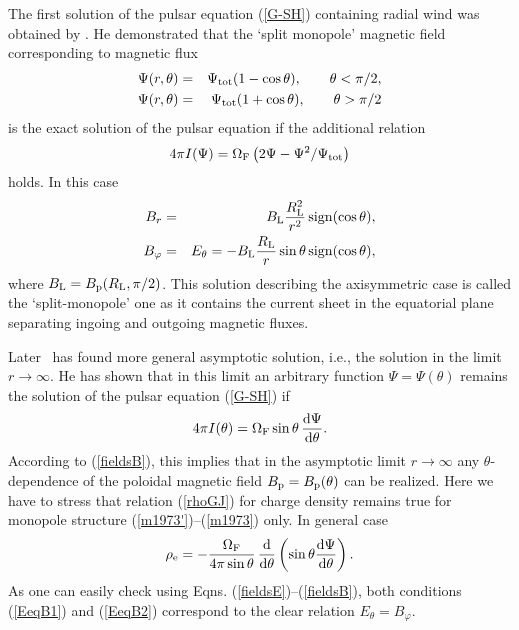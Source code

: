 \documentclass[useAMS,usenatbib]{mn2e}
\begin{document}
The first solution of the pulsar equation (\ref{G-SH}) containing radial wind
was obtained by \citet{1973ApJ...180L.133M}. He demonstrated that the `split 
monopole' magnetic field corresponding to magnetic flux
\begin{eqnarray}
\Psi(r, \theta) & = & \Psi_{\rm tot}(1 - \cos\theta), \qquad \theta < \pi/2, \\
\Psi(r, \theta) & = & \Psi_{\rm tot}(1 + \cos\theta), \qquad \theta > \pi/2
\label{Michel}
\end{eqnarray}
is the exact solution of the pulsar equation if the additional relation
\begin{equation}
4 \pi I(\Psi) = \Omega_{\rm F} \left(2\Psi - \Psi^2/\Psi_{\rm tot}\right)
\label{EeqB1}
\end{equation}
holds. In this case
\begin{eqnarray}
B_{r} & = & B_{\rm L}\frac{R_{\rm L}^2}{r^2} \, {\rm sign}(\cos\theta),
\label{m1973'} \\
B_{\varphi} & = & E_{\theta} = -B_{\rm L}\frac{R_{\rm L}}{r}\sin\theta 
\, {\rm sign}(\cos\theta),
\label{m1973}
\end{eqnarray}
where $B_{\rm L} = B_{\rm p}(R_{\rm L}, \pi/2)$. 
This solution describing the axisymmetric case is called the `split-monopole' one as it contains 
the current sheet in the equatorial plane separating ingoing and outgoing magnetic fluxes.

Later~\citet{1973ApJ...186..625I} has found more general asymptotic solution, i.e., 
the solution in the limit $r \rightarrow \infty$. He has shown that in this limit 
an arbitrary function $\Psi = \Psi(\theta)$ remains the solution of the pulsar 
equation (\ref{G-SH}) if
\begin{equation}
4 \pi I(\theta) = \Omega_{\rm F} \sin\theta \, \frac{{\rm d}\Psi}{{\rm d}\theta}.
\label{EeqB2}
\end{equation}
According to (\ref{fieldsB}), this implies that in the asymptotic limit
$r \rightarrow \infty$ any $\theta$-dependence of the poloidal magnetic field
$B_{\rm p} = B_{\rm p}(\theta)$ can be realized. Here we have to stress that 
relation (\ref{rhoGJ}) for charge density remains true for monopole structure 
(\ref{m1973'})--(\ref{m1973}) only. In general case
\begin{equation}
\rho_{\rm e} = -\frac{\Omega_{\rm F}}{4 \pi \sin\theta} \,
\frac{{\rm d}}{{\rm d}\theta}\left(\sin\theta\frac{{\rm d}\Psi}{{\rm d}\theta}\right).
\end{equation}
As one can easily check using Eqns. (\ref{fieldsE})--(\ref{fieldsB}), both conditions 
(\ref{EeqB1}) and (\ref{EeqB2}) correspond to the clear relation $E_{\theta} = B_{\varphi}$.
\end{document}
